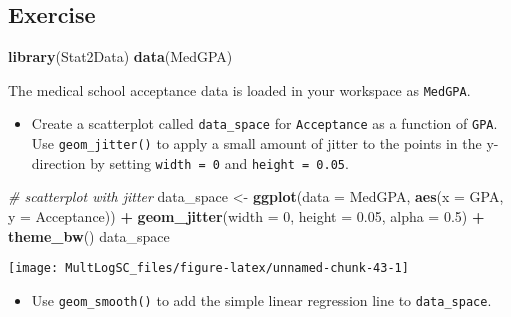 \documentclass[
]{book}
\newenvironment{Shaded}{\begin{snugshade}}{\end{snugshade}}
\newcommand{\CommentTok}[1]{\textcolor[rgb]{0.56,0.35,0.01}{\textit{#1}}}
\newcommand{\DataTypeTok}[1]{\textcolor[rgb]{0.13,0.29,0.53}{#1}}
\newcommand{\DecValTok}[1]{\textcolor[rgb]{0.00,0.00,0.81}{#1}}
\newcommand{\FloatTok}[1]{\textcolor[rgb]{0.00,0.00,0.81}{#1}}
\newcommand{\KeywordTok}[1]{\textcolor[rgb]{0.13,0.29,0.53}{\textbf{#1}}}
\newcommand{\NormalTok}[1]{#1}
\newcommand{\OperatorTok}[1]{\textcolor[rgb]{0.81,0.36,0.00}{\textbf{#1}}}
\newcommand{\StringTok}[1]{\textcolor[rgb]{0.31,0.60,0.02}{#1}}
\providecommand{\tightlist}{%
  \setlength{\itemsep}{0pt}\setlength{\parskip}{0pt}}
\begin{document}
\hypertarget{exercise-12}{%
\subsection*{Exercise}\label{exercise-12}}

\begin{Shaded}
\begin{Highlighting}[]
\KeywordTok{library}\NormalTok{(Stat2Data)}
\KeywordTok{data}\NormalTok{(MedGPA)}
\end{Highlighting}
\end{Shaded}

The medical school acceptance data is loaded in your workspace as \texttt{MedGPA}.

\begin{itemize}
\tightlist
\item
  Create a scatterplot called \texttt{data\_space} for \texttt{Acceptance} as a function of \texttt{GPA}. Use \texttt{geom\_jitter()} to apply a small amount of jitter to the points in the y-direction by setting \texttt{width\ =\ 0} and \texttt{height\ =\ 0.05}.
\end{itemize}

\begin{Shaded}
\begin{Highlighting}[]
\CommentTok{# scatterplot with jitter}
\NormalTok{data_space <-}\StringTok{ }\KeywordTok{ggplot}\NormalTok{(}\DataTypeTok{data =}\NormalTok{ MedGPA, }\KeywordTok{aes}\NormalTok{(}\DataTypeTok{x =}\NormalTok{ GPA, }\DataTypeTok{y =}\NormalTok{ Acceptance)) }\OperatorTok{+}
\StringTok{  }\KeywordTok{geom_jitter}\NormalTok{(}\DataTypeTok{width =} \DecValTok{0}\NormalTok{, }\DataTypeTok{height =} \FloatTok{0.05}\NormalTok{, }\DataTypeTok{alpha =} \FloatTok{0.5}\NormalTok{) }\OperatorTok{+}\StringTok{ }
\StringTok{  }\KeywordTok{theme_bw}\NormalTok{()}
\NormalTok{data_space}
\end{Highlighting}
\end{Shaded}

\begin{center}\texttt{[image: MultLogSC\_files/figure-latex/unnamed-chunk-43-1]} \end{center}

\begin{itemize}
\tightlist
\item
  Use \texttt{geom\_smooth()} to add the simple linear regression line to \texttt{data\_space}.
\end{itemize}
\end{document}
